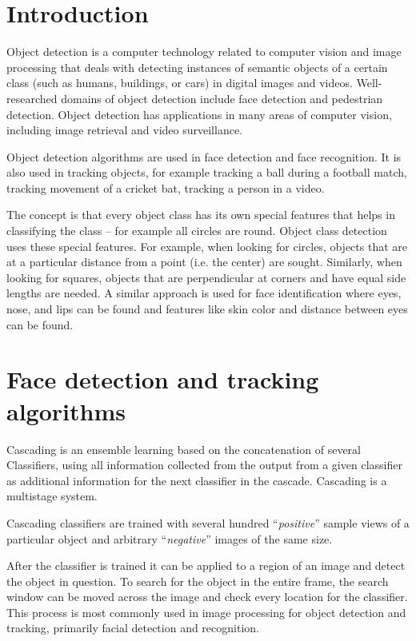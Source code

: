 \documentclass[a4paper,12pt]{report}
\begin{document}
  \section{Introduction}
    Object detection is a computer technology related to computer vision and image processing that deals with detecting instances of semantic objects of a certain class (such as humans, buildings, or cars) in digital images and videos. Well-researched domains of object detection include face detection and pedestrian detection. Object detection has applications in many areas of computer vision, including image retrieval and video surveillance. \par
    Object detection algorithms are used in face detection and face recognition. It is also used in tracking objects, for example tracking a ball during a football match, tracking movement of a cricket bat, tracking a person in a video.\par
    The concept is that every object class has its own special features that helps in classifying the class – for example all circles are round. Object class detection uses these special features. For example, when looking for circles, objects that are at a particular distance from a point (i.e. the center) are sought. Similarly, when looking for squares, objects that are perpendicular at corners and have equal side lengths are needed. A similar approach is used for face identification where eyes, nose, and lips can be found and features like skin color and distance between eyes can be found\cite{wiki_link}.\par

\section{Face detection and tracking algorithms}
    Cascading is an ensemble learning based on the concatenation of several Classifiers, using all information collected from the output from a given classifier as additional information for the next classifier in the cascade. Cascading is a multistage system.\par
    Cascading classifiers are trained with several hundred ``\emph{positive}'' sample views of a particular object and arbitrary ``\emph{negative}'' images of the same size. \par
    After the classifier is trained it can be applied to a region of an image and detect the object in question. To search for the object in the entire frame, the search window can be moved across the image and check every location for the classifier. This process is most commonly used in image processing for object detection and tracking, primarily facial detection and recognition.\par
\end{document}
